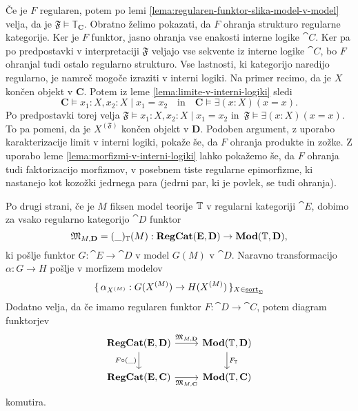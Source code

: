 \documentclass[../kategoricna_logika.tex]{subfiles}
\begin{document}
\begin{dokaz}
  Če je $F$ regularen, potem po lemi
  \ref{lema:regularen-funktor-slika-model-v-model} velja, da je
  $\mathfrak{F} \models \mathbb{T}_{\mathbf{C}}$.  Obratno želimo
  pokazati, da $F$ ohranja strukturo regularne kategorije. Ker je $F$
  funktor, jasno ohranja vse enakosti interne logike $\cat{C}$. Ker pa
  po predpostavki v interpretaciji $\mathfrak{F}$ veljajo vse sekvente
  iz interne logike $\cat{C}$, bo $F$ ohranjal tudi ostalo regularno
  strukturo. Vse lastnosti, ki kategorijo naredijo regularno, je
  namreč mogoče izraziti v interni logiki. Na primer recimo, da je $X$
  končen objekt v $\mathbf{C}$. Potem iz leme
  \ref{lema:limite-v-interni-logiki} sledi
  \[ \mathbf{C} \models x_1:X,x_2:X \mid  x_{1} = x_{2}\quad \text{in} \quad \mathbf{C}
    \models \exists (x:X) (x = x).\]
  Po predpostavki torej velja
  $\mathfrak{F} \models x_1:X, x_2:X \mid x_{1} = x_{2}$
  in~${\mathfrak{F} \models \exists (x:X) (x = x)}$.  To pa pomeni, da je
  $X^{(\mathfrak{F})}$ končen objekt v $\mathbf{D}$.  Podoben
  argument, z uporabo karakterizacije limit v interni logiki, pokaže
  še, da $F$ ohranja produkte in zožke.  Z uporabo leme
  \ref{lema:morfizmi-v-interni-logiki} lahko pokažemo še, da $F$
  ohranja tudi faktorizacijo morfizmov, v posebnem tiste regularne
  epimorfizme, ki nastanejo kot kozožki jedrnega para (jedrni par, ki
  je povlek, se tudi ohranja).
\end{dokaz}
Po drugi strani, če je $M$ fiksen model teorije $\mathbb{T}$ v regularni
kategoriji $\cat{E}$, dobimo za vsako regularno kategorijo $\cat{D}$
funktor
\begin{equation}\label{equation:def-funktor-iz-regcat-v-mod}
  \mathfrak{M}_{M,{\operatorname{\mathbf{D}}}} = (\_)_{\mathbb{T}}(M): {\operatorname{\mathbf{RegCat}}}({\operatorname{\mathbf{E}}}, {\operatorname{\mathbf{D}}}) \to \mathbf{Mod}(\mathbb{T}, {\operatorname{\mathbf{D}}}),
\end{equation}
ki pošlje funktor $G : \cat{E} \to \cat{D}$ v model $G(M)$ v
$\cat{D}$.  Naravno transformacijo $\alpha : G \to H$ pošlje v
morfizem modelov
$$\lbrace\,\alpha_{{X}^{(M)}}: G({X}^{(M)}) \to H({X}^{(M)})\,\rbrace_{X \in \underline{\mathrm{sort}}_{\Sigma}}$$
Dodatno velja, da če imamo regularen funktor
$F : \cat{D} \to \cat{C}$, potem diagram funktorjev
\begin{equation}\label{diag:naravnost-M}
  \begin{tikzcd}
    \cat{RegCat}(\cat{E}, \cat{D}) \ar[d, "F \circ (\_)"'] \ar[r, "\mathfrak{M}_{M,\cat{D}}"] & \Mod(\T, \cat{D}) \ar[d, "F_{\T}"] \\
    \cat{RegCat}(\cat{E}, \cat{C}) \ar[r, "\mathfrak{M}_{M,\cat{C}}"']
    & \Mod(\T, \cat{C})
  \end{tikzcd}
\end{equation}
komutira.
\end{document}
